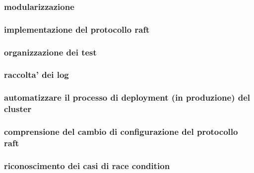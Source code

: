 \documentclass[a4paper]{article}
\begin{document}
\subsubsection{modularizzazione}
\subsubsection{implementazione del protocollo raft}
\subsubsection{organizzazione dei test}
\subsubsection{raccolta' dei log}
\subsubsection{automatizzare il processo di deployment (in produzione) del cluster}
\subsubsection{comprensione del cambio di configurazione del protocollo raft}
\subsubsection{riconoscimento dei casi di race condition}
\end{document}

